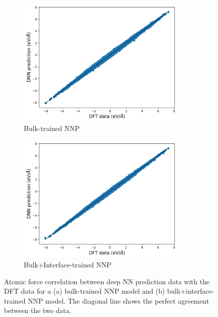 \clearpage

\begin{figure}[tbhp!]
	\centering
	\begin{subfigure}{0.47\textwidth}
		\centering

		\includegraphics[width=0.9\textwidth]{images/bulk_NN_on_interface/2_force.png}
		\caption{Bulk-trained NNP}\label{fig:corr_bulk_NN_F}
	\end{subfigure}
	\hfill
	\begin{subfigure}{0.47\textwidth}
		\centering

		\includegraphics[width=0.9\textwidth]{images/bulk+interface_NN_on_interface/2_force.png}
		\caption{Bulk+Interface-trained NNP}\label{fig:corr_bulk+interface_NN_F}
	\end{subfigure}
	\caption{Atomic force correlation between deep NN prediction data with
		the DFT data
		for a
		(a) bulk-trained NNP model and (b) bulk+interface-trained NNP
		model. The
		diagonal line shows the perfect agreement between the two
		data.}\label{fig:corr_F}
\end{figure}

